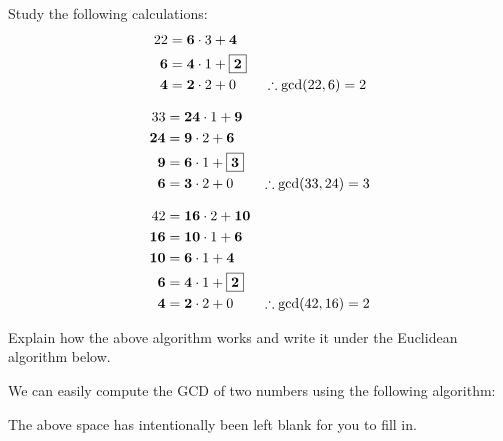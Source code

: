 \documentclass{ximera}
\begin{document}
\begin{exercise} Study the following calculations:
\begin{align*}
  22 &= \boldsymbol{6}\cdot 3 + \boldsymbol{4}\\
  \boldsymbol{6} &= \boldsymbol{4} \cdot 1 + \fbox{$\boldsymbol{2}$}\\
  \boldsymbol{4} &= \boldsymbol{2} \cdot 2 + 0 \qquad
\therefore \gcd(22,6) = 2
\end{align*}

\begin{align*}
33 &= \boldsymbol{24}\cdot 1 + \boldsymbol{9}\\
\boldsymbol{24} &= \boldsymbol{9} \cdot 2 + \boldsymbol{6}\\
\boldsymbol{9} &= \boldsymbol{6} \cdot 1 + \fbox{$\boldsymbol{3}$}\\
\boldsymbol{6} &= \boldsymbol{3} \cdot 2 + 0 \qquad \therefore \gcd(33,24) = 3 
\end{align*}

\begin{align*}
42 &= \boldsymbol{16}\cdot 2 + \boldsymbol{10}\\
\boldsymbol{16} &= \boldsymbol{10} \cdot 1 + \boldsymbol{6}\\
\boldsymbol{10} &= \boldsymbol{6} \cdot 1 + \boldsymbol{4}\\
\boldsymbol{6} &= \boldsymbol{4} \cdot 1 + \fbox{$\boldsymbol{2}$}\\
\boldsymbol{4} &= \boldsymbol{2} \cdot 2 + 0 \qquad \therefore \gcd(42,16) = 2 
\end{align*}

Explain how the above algorithm works and write it under the Euclidean
algorithm below.
\end{exercise}


\begin{theorem} 
We can easily compute the GCD of two numbers using the following
algorithm:
\vspace{2in}

\end{theorem}
\noindent The above space has intentionally been left blank for you to
fill in.
\end{document}
